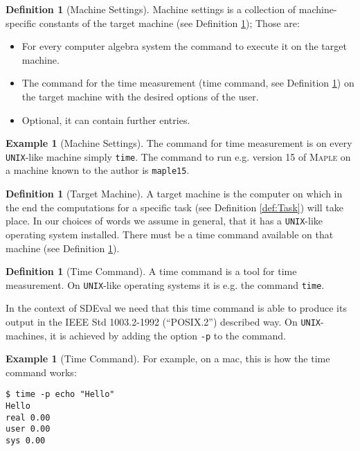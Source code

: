 \documentclass[11pt,a4paper]{amsart}
\numberwithin{equation}{section}
\theoremstyle{definition}
\newtheorem{definition}[theorem]{Definition}
\newtheorem{example}[theorem]{Example}
\begin{document}
\begin{definition}[Machine Settings]
\label{def:MachineSettings}
Machine settings is a collection of machine-specific constants of the
target machine (see Definition \ref{def:TargetMachine}); Those are:
\begin{itemize}
  \item For every computer algebra system the command to execute it on
    the target machine.
  \item The command for the time measurement (time command, see
    Definition \ref{def:TimeCommand}) on the target machine with the
    desired options of the user.
  \item Optional, it can contain further entries.
\end{itemize}
\end{definition}

\begin{example}[Machine Settings]
  The command for time measurement is on every \texttt{UNIX}-like
  machine simply \texttt{time}. The command to run e.g. version 15 of
  \textsc{Maple} on a machine known to the author is \texttt{maple15}.
\end{example}

\begin{definition}[Target Machine]
  \label{def:TargetMachine}
  A target machine is the computer on which in the end the
  computations for a specific task (see Definition \ref{def:Task})
  will take place. In our choices of words we assume in general, that
  it has a \texttt{UNIX}-like operating system installed. There must
  be a time command available on that machine (see Definition \ref{def:TimeCommand}).
\end{definition}

\begin{definition}[Time Command]
  \label{def:TimeCommand}
  A time command is a tool for time measurement. On \texttt{UNIX}-like
  operating systems it is e.g. the command \texttt{time}.

  In the context of SDEval we need that this time command is able to produce its
  output in the IEEE Std 1003.2-1992 (``POSIX.2'') described way. On
  \texttt{UNIX}-machines, it is achieved by adding the option
  \texttt{-p} to the command.
\end{definition}

\begin{example}[Time Command]
  For example, on a mac, this is how the time command works:
  \begin{verbatim}
$ time -p echo "Hello"
Hello
real 0.00
user 0.00
sys 0.00
 \end{verbatim}
\end{example}
\end{document}

